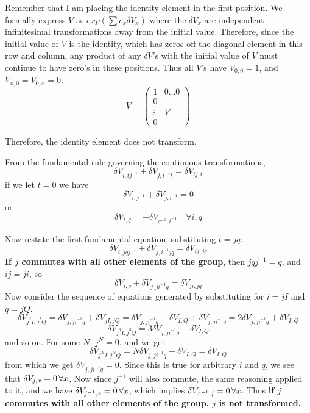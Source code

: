 \documentclass[12pt]{article}
\begin{document}
Remember that I am placing the identity element in the first
position.  We formally express $V$ as $ exp( \sum c_x \delta V_x)$
where the $\delta V_x$ are independent infinitesimal transformations away
from the initial value.  Therefore, since the initial value of $V$ is the identity, which
has zeros off the diagonal element in this row and column, any product of
any $\delta V$'s with the initial value of $V$ must continue to have zero's
in these positions.  Thus all $V$'s have $V_{0,0} = 1$, and $V_{x,0} = V_{0,x} = 0$.
\begin{equation}
V = \left( \begin{array}{cc} 1 & {0 \ldots 0} \\ 0 & \\ {\vdots} & V' \\
0 & \end{array} \right) \end{equation}

 Therefore, the identity element does not transform.


From the fundamental rule governing the continuous transformations,
$$
\delta V_{i,tj^{-1}} + \delta V_{j,i^{-1}t} = \delta V_{ij,t}
$$
if we let $t=0$ we have
$$
\delta V_{i,j^{-1}} + \delta V_{j,i^{-1}} = 0
$$
or
\begin{equation}
\delta V_{i,q} = -\delta V_{q^{-1},i^{-1}} \quad \forall i,q
\end{equation}

 Now restate the first fundamental equation, substituting $t = jq$.
$$\delta V_{i,jqj^{-1}} + \delta V_{j,i^{-1}jq} = \delta V_{ij,jq}$$
{\bf If $j$ commutes with all other elements of the group}, then
$jqj^{-1} = q$, and $ij = ji$, so
$$\delta V_{i,q} + \delta V_{j,ji^{-1}q} = \delta V_{ji,jq}$$
Now consider the sequence of equations generated by substituting for
$i = jI$ and $q = jQ$.
$$\delta V_{j^2I,j^2Q} = \delta V_{j,ji^{-1}q} + \delta V_{jI,jQ} =
\delta V_{j,ji^{-1}q} + \delta V_{I,Q} + \delta V_{j,ji^{-1}q} =
2 \delta V_{j,ji^{-1}q} + \delta V_{I,Q}$$
$$
\delta V_{j^3I,j^3Q} = 3 \delta V_{j,ji^{-1}q} + \delta V_{I,Q}
$$
and so on.  For some $N$, $j^N = 0$, and we get
$$
\delta V_{j^NI,j^NQ} = N \delta V_{j,ji^{-1}q} + \delta V_{I,Q} =\delta V_{I,Q}
$$
from which we get $\delta V_{j,ji^{-1}q} = 0$.  Since this is true for
arbitrary $i$ and $q$, we see that $\delta V_{j,x} = 0 \thinspace \forall x$.
Now since $j^{-1}$ will also commute, the same reasoning applied to it, and
we have $\delta V_{j^{-1},x} = 0 \thinspace \forall x$, which implies
$\delta V_{x^{-1},j} = 0 \thinspace \forall x$.  Thus {\bf if $j$ commutes
with all other elements of the group, $j$ is not transformed.}
\end{document}
